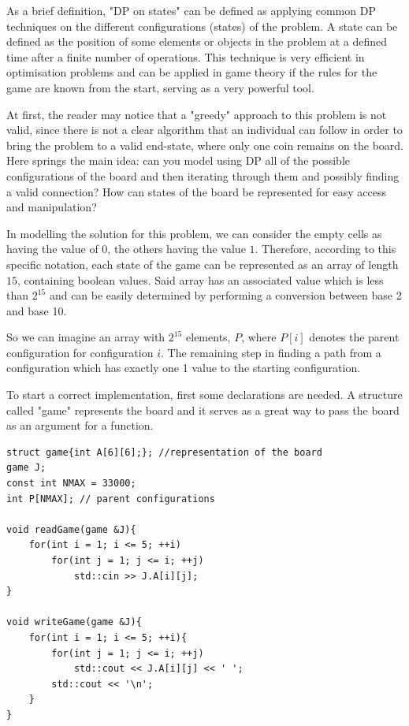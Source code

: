 \documentclass[letterpaper]{article}
\begin{document}
\newpage

As a brief definition, "DP on states" can be defined as applying common DP techniques on the different configurations (states) of the problem. A state can be defined as the position of some elements or objects in the problem at a defined time after a finite number of operations. This technique is very efficient in optimisation problems and can be applied in game theory if the rules for the game are known from the start, serving as a very powerful tool.

At first, the reader may notice that a "greedy" approach to this problem is not valid, since there is not a clear algorithm that an individual can follow in order to bring the problem to a valid end-state, where only one coin remains on the board. Here springs the main idea: can you model using DP all of the possible configurations of the board and then iterating through them and possibly finding a valid connection? How can states of the board be represented for easy access and manipulation?

In modelling the solution for this problem, we can consider the empty cells as having the value of $0$, the others having the value $1$. Therefore, according to this specific notation, each state of the game can be represented as an array of length $15$, containing boolean values. Said array has an associated value which is less than $2^{15}$ and can be easily determined by performing a conversion between base 2 and base 10.

So we can imagine an array with $2^{15}$ elements, $P$, where $P[i]$ denotes the parent configuration for configuration $i$. The remaining step in finding a path from a configuration which has exactly one 1 value to the starting configuration.

To start a correct implementation, first some declarations are needed. A structure called "game" represents the board and it serves as a great way to pass the board as an argument for a function.

\begin{lstlisting}
struct game{int A[6][6];}; //representation of the board
game J;
const int NMAX = 33000;
int P[NMAX]; // parent configurations

void readGame(game &J){
    for(int i = 1; i <= 5; ++i)
        for(int j = 1; j <= i; ++j)
            std::cin >> J.A[i][j];
}

void writeGame(game &J){
    for(int i = 1; i <= 5; ++i){
        for(int j = 1; j <= i; ++j)
            std::cout << J.A[i][j] << ' ';
        std::cout << '\n';
    }
}
\end{lstlisting}
\end{document}
